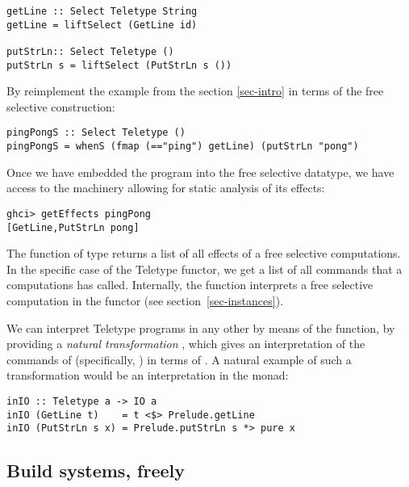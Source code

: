 \begin{verbatim}
getLine :: Select Teletype String
getLine = liftSelect (GetLine id)

putStrLn:: Select Teletype ()
putStrLn s = liftSelect (PutStrLn s ())
\end{verbatim}

By reimplement the  example from the section \ref{sec-intro}
in terms of the free selective construction:

\begin{verbatim}
pingPongS :: Select Teletype ()
pingPongS = whenS (fmap (=="ping") getLine) (putStrLn "pong")
\end{verbatim}

Once we have embedded the  program into the free selective datatype,
we have access to the machinery allowing for static analysis of its effects:

\begin{verbatim}
ghci> getEffects pingPong
[GetLine,PutStrLn pong]
\end{verbatim}

The  function of type 
returns a list of all effects of a free selective computations. In the specific case of
the Teletype functor, we get a list of all commands that a computations has called.
Internally, the  function interprets a free selective computation
in the  functor (see section~\ref{sec-instances}).

We can interpret Teletype programs in any other  by means of the
 function, by providing a \emph{natural transformation} , which gives an interpretation of the commands of
 (specifically, ) in terms of . A natural example of such a
transformation would be an interpretation in the  monad:

\begin{verbatim}
inIO :: Teletype a -> IO a
inIO (GetLine t)    = t <$> Prelude.getLine
inIO (PutStrLn s x) = Prelude.putStrLn s *> pure x
\end{verbatim}

\subsection{Build systems, freely}\label{sec-free-build}

